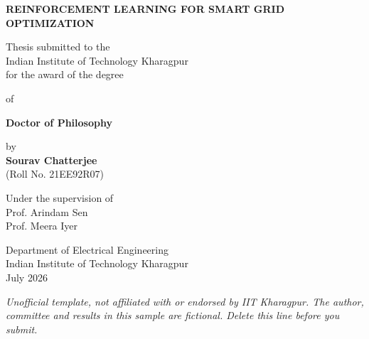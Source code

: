 \begin{titlepage}
\centering
\begin{singlespace}
\vspace*{0.4in}
{\large\bfseries\MakeUppercase{Reinforcement Learning for Smart Grid Optimization}\par}
\vspace{0.8in}
Thesis submitted to the\\
Indian Institute of Technology Kharagpur\\
for the award of the degree\par\vspace{0.2in}
of\par\vspace{0.2in}
{\bfseries Doctor of Philosophy}\par\vspace{0.3in}
by\\
{\bfseries Sourav Chatterjee}\\
(Roll No. 21EE92R07)\par\vspace{0.3in}
Under the supervision of\\
Prof. Arindam Sen\\
Prof. Meera Iyer\par\vspace{0.6in}
Department of Electrical Engineering\\
Indian Institute of Technology Kharagpur\\
July 2026
\end{singlespace}
\vfill
{\footnotesize\itshape Unofficial template, not affiliated with or endorsed by IIT Kharagpur. The author, committee and results in this sample are fictional. Delete this line before you submit.}
\end{titlepage}
